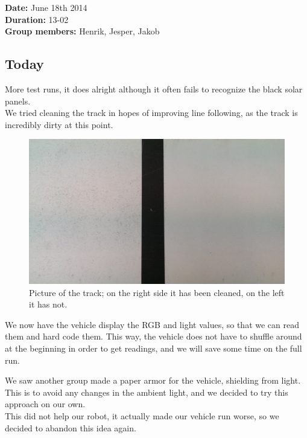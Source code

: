 \textbf{Date:} June 18th 2014\\\textbf{Duration:} 13-02\\\textbf{Group
members:} Henrik, Jesper, Jakob

\subsection{Today}

More test runs, it does alright although it often fails to recognize the
black solar panels.\\We tried cleaning the track in hopes of improving
line following, as the track is incredibly dirty at this
point.
\begin{figure}[hbt]
  \centering
  \includegraphics[scale=0.13]{../experiments/images/cleaning.jpg}
  \caption{Picture of the track; on the right side it has been cleaned, on the left it has not.}
\end{figure}
We now have the vehicle display the RGB and light values, so that we can
read them and hard code them. This way, the vehicle does not have to
shuffle around at the beginning in order to get readings, and we will save
some time on the full run.

We saw another group made a paper armor for the vehicle, shielding from
light. This is to avoid any changes in the ambient light, and we decided
to try this approach on our own.\\This did not help our robot, it actually made
our vehicle run worse, so we decided to abandon this idea again.

